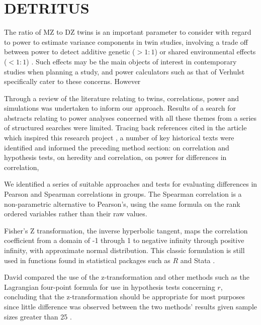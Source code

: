 \section{DETRITUS}
The ratio of MZ to DZ twins is an important parameter to consider with regard to power to estimate variance components in twin studies, involving a trade off between power to detect additive genetic ($>1:1$) or shared environmental effects ($<1:1$) \cite{Visscher2008}.  Such effects may be the main objects of interest in contemporary studies when planning a study, and power calculators such as that of Verhulst \cite{Verhulst2017} specifically cater to these concerns.  However


Through a review of the literature relating to twins, correlations, power and simulations was undertaken to inform our approach.  Results of a search for abstracts relating to power analyses concerned with all these themes from a series of structured searches were limited.  Tracing back references cited in the article which inspired this research project \cite{Verhulst2017}, a number of key historical texts were identified and informed the preceding method section: \cite{David1938} on correlation and hypothesis tests, \cite{Falconer1960} on heredity and correlation,  \cite{Cohen1988} on power for differences in correlation, 

We identified a series of suitable approaches and tests for evaluating differences in Pearson and Spearman correlations in groups.  The Spearman correlation is a non-parametric alternative to Pearson's, using the same formula on the rank ordered variables rather than their raw values.


Fisher's Z transformation, the inverse hyperbolic tangent, maps the correlation coefficient from a domain of -1 through 1 to negative infinity through positive infinity, with approximate normal distribution.  This classic formulation is still used in functions found in statistical packages such as $R$ and Stata \cite{R2018,StataCorp2013}.

David compared the use of the z-transformation and other methods such as the Lagrangian four-point formula for use in hypothesis tests concerning $r$, concluding that the z-transformation should be appropriate for most purposes since little difference was observed between the two methods' results given sample sizes greater than 25 \cite{David1938}.
